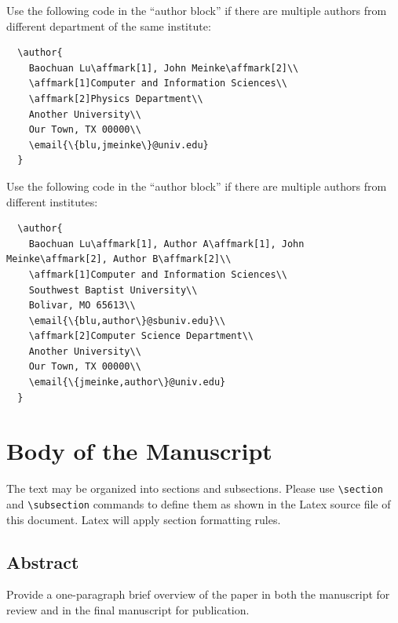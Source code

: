 \documentclass[article,twoside]{combine}
\begin{document}
Use the following code in the ``author block'' if there are multiple authors from different department of the same institute:

\begin{lstlisting}
  \author{
    Baochuan Lu\affmark[1], John Meinke\affmark[2]\\
    \affmark[1]Computer and Information Sciences\\
    \affmark[2]Physics Department\\
    Another University\\
    Our Town, TX 00000\\
    \email{\{blu,jmeinke\}@univ.edu}
  }
\end{lstlisting}

Use the following code in the ``author block'' if there are multiple authors from different institutes:
\begin{lstlisting}
  \author{
    Baochuan Lu\affmark[1], Author A\affmark[1], John Meinke\affmark[2], Author B\affmark[2]\\
    \affmark[1]Computer and Information Sciences\\
    Southwest Baptist University\\
    Bolivar, MO 65613\\
    \email{\{blu,author\}@sbuniv.edu}\\
    \affmark[2]Computer Science Department\\
    Another University\\
    Our Town, TX 00000\\
    \email{\{jmeinke,author\}@univ.edu}
  }
\end{lstlisting}

\section{Body of the Manuscript}
The text may be organized into sections and subsections. Please use
\verb+\section+ and  \verb+\subsection+ commands to define them as shown in the
Latex source file of this document. Latex will apply section formatting rules.

\subsection{Abstract}
Provide a one-paragraph brief overview of the paper in both the manuscript for
review and in the final manuscript for publication.
\end{document}
